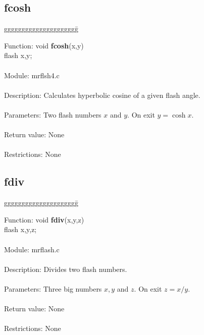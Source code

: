 \subsection{fcosh}

\begin{tabbing}
ggggggggggggggggggggg\= \kill

      Function:      \>void {\bf fcosh}(x,y) \\
                     \>flash x,y; \\
      \ \\
      Module:        \>mrflsh4.c \\
      \ \\
      Description:   \>Calculates hyperbolic cosine of a given flash angle. \\
      \ \\
      Parameters:    \>Two flash numbers $x$ and $y$. On exit $y=\cosh x$. \\
      \ \\
      Return value:  \>None \\
      \ \\
      Restrictions:  \>None \\

\end{tabbing}

\subsection{fdiv}

\begin{tabbing}
ggggggggggggggggggggg\= \kill


      Function:      \>void {\bf fdiv}(x,y,z) \\
                     \>flash x,y,z; \\
      \ \\
      Module:        \>mrflash.c \\
      \ \\
      Description:   \>Divides two flash numbers. \\
      \ \\
      Parameters:    \>Three big numbers $x, y$ and $z$. On exit $z=x/y$. \\
      \ \\
      Return value:  \>None \\
      \ \\
      Restrictions:  \>None \\

\end{tabbing}
\pagebreak
